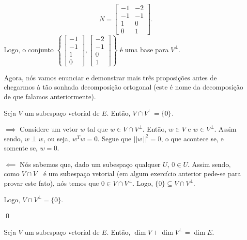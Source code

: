 \begin{Example}
	$$
	N = \begin{bmatrix}
		-1 & -2 \\
		-1 & -1 \\
		1 & 0 \\
		0 & 1
	\end{bmatrix}.
	$$
	Logo, o conjunto $\left\{\begin{bmatrix}
		-1 \\
		-1 \\
		1 \\
		0
	\end{bmatrix}, \begin{bmatrix}
		-2 \\
		-1 \\
		0 \\
		1
	\end{bmatrix}\right\}$ é uma base para $V^\perp$.
\end{Example}

Agora, nós vamos enunciar e demonstrar mais três proposições antes de chegarmos à tão sonhada decomposição ortogonal (este é nome da decomposição de que falamos anteriormente).

\begin{Proposition}
	Seja $V$ um subespaço vetorial de $E$. Então, $V\cap V^\perp = \{0\}$.
\end{Proposition}

\begin{Proof}
	$\implies$ Considere um vetor $w$ tal que $w\in V\cap V^\perp$. Então, $w\in V$ e $w\in V^\perp$. Assim sendo, $w\perp w$, ou seja, $w^Tw = 0$. Segue que $||w||^2 = 0$, o que acontece se, e somente se, $w = 0$.
	
	$\impliedby$ Nós sabemos que, dado um subespaço qualquer $U$, $0\in U$. Assim sendo, como $V\cap V^\perp$ é um subespaço vetorial (em algum exercício anterior pede-se para provar este fato), nós temos que $0\in V\cap V^\perp$. Logo, $\{0\}\subseteq V\cap V^\perp$.
	
	Logo, $V\cap V^\perp = \{0\}$.
	
	\qed
\end{Proof}

\begin{Proposition}
	Seja $V$ um subespaço vetorial de $E$. Então, $\dim V + \dim V^\perp = \dim E$.
\end{Proposition}

